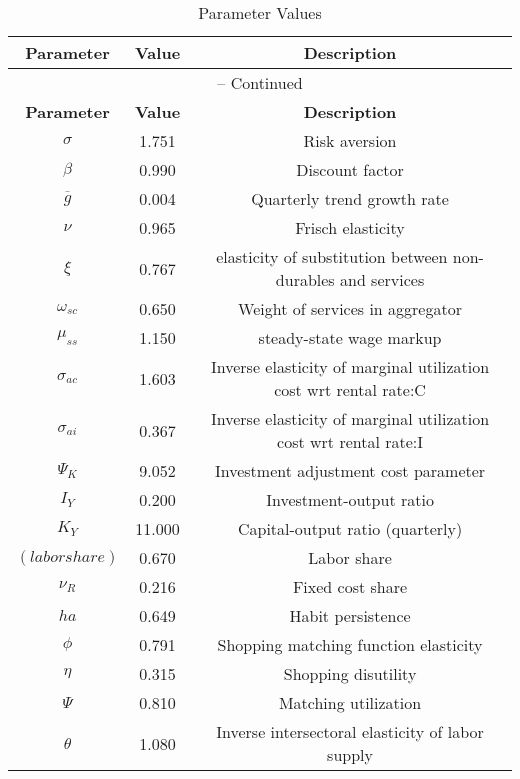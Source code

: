 \begin{center}
\begin{longtable}{ccc}
\caption{Parameter Values}\\%
\toprule%
\multicolumn{1}{c}{\textbf{Parameter}} &
\multicolumn{1}{c}{\textbf{Value}} &
 \multicolumn{1}{c}{\textbf{Description}}\\%
\midrule%
\endfirsthead
\multicolumn{3}{c}{{\tablename} \thetable{} -- Continued}\\%
\midrule%
\multicolumn{1}{c}{\textbf{Parameter}} &
\multicolumn{1}{c}{\textbf{Value}} &
  \multicolumn{1}{c}{\textbf{Description}}\\%
\midrule%
\endhead
${\sigma}$ 	 & 	 1.751 	 & 	 Risk aversion\\
${\beta}$ 	 & 	 0.990 	 & 	 Discount factor\\
${\overline{g}}$ 	 & 	 0.004 	 & 	 Quarterly trend growth rate\\
$\nu$ 	 & 	 0.965 	 & 	 Frisch elasticity\\
$\xi$ 	 & 	 0.767 	 & 	 elasticity of substitution between non-durables and services\\
$\omega_{sc}$ 	 & 	 0.650 	 & 	 Weight of services in aggregator\\
$\mu_{ss}$ 	 & 	 1.150 	 & 	 steady-state wage markup\\
${\sigma_{ac}}$ 	 & 	 1.603 	 & 	 Inverse elasticity of marginal utilization cost wrt rental rate:C\\
${\sigma_{ai}}$ 	 & 	 0.367 	 & 	 Inverse elasticity of marginal utilization cost wrt rental rate:I\\
${\Psi_{K}}$ 	 & 	 9.052 	 & 	 Investment adjustment cost parameter\\
${I_Y}$ 	 & 	 0.200 	 & 	 Investment-output ratio\\
${K_Y}$ 	 & 	 11.000 	 & 	 Capital-output ratio (quarterly)\\
$(labor share)$ 	 & 	 0.670 	 & 	 Labor share\\
${\nu_R}$ 	 & 	 0.216 	 & 	 Fixed cost share\\
${ha}$ 	 & 	 0.649 	 & 	 Habit persistence\\
${\phi}$ 	 & 	 0.791 	 & 	 Shopping matching function elasticity\\
${\eta}$ 	 & 	 0.315 	 & 	 Shopping disutility\\
${\Psi}$ 	 & 	 0.810 	 & 	 Matching utilization\\
${\theta}$ 	 & 	 1.080 	 & 	 Inverse intersectoral elasticity of labor supply\\

\end{longtable}
\end{center}
